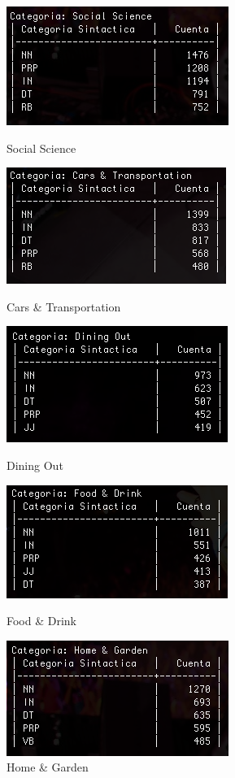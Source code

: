 \documentclass{article}
\begin{document}
\newpage
\begin{figure}
\centering
\includegraphics[scale=0.5]{figuras/cat11.png}
\caption{Social Science}
\label{fig:cat11}
\includegraphics[scale=0.5]{figuras/cat12.png}
\caption{Cars \& Transportation}
\label{fig:cat12}
\includegraphics[scale=0.5]{figuras/cat13.png}
\caption{Dining Out}
\label{fig:cat13}
\includegraphics[scale=0.5]{figuras/cat14.png}
\caption{Food \& Drink}
\label{fig:cat14}
\includegraphics[scale=0.5]{figuras/cat15.png}
\caption{Home \& Garden}
\label{fig:cat15}
\end{figure}
\end{document}
